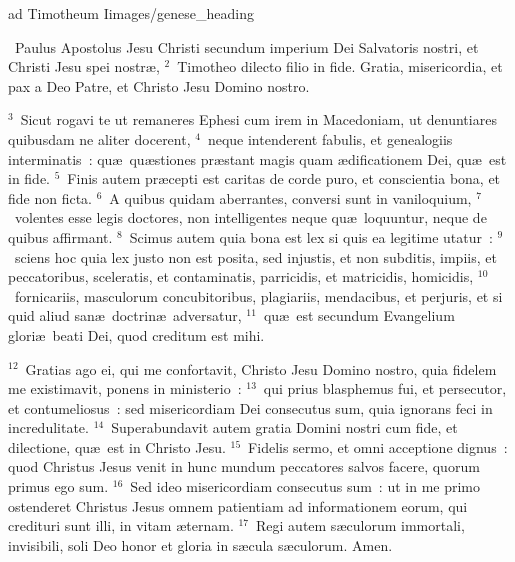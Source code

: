 {ad Timotheum I}{images/genese_heading}

~\lettrine[lines=10,image=true,loversize=0.05,lraise=-0.03]{P}{}aulus Apostolus Jesu Christi secundum imperium Dei Salvatoris nostri, et Christi Jesu spei nostr\ae ,
${}^{2}$~Timotheo dilecto filio in fide. Gratia, misericordia, et pax a Deo Patre, et Christo Jesu Domino nostro.


${}^{3}$~Sicut rogavi te ut remaneres Ephesi cum irem in Macedoniam, ut denuntiares quibusdam ne aliter docerent,
${}^{4}$~neque intenderent fabulis, et genealogiis interminatis~: qu\ae\ qu\ae stiones pr\ae stant magis quam \ae dificationem Dei, qu\ae\ est in fide.
${}^{5}$~Finis autem pr\ae cepti est caritas de corde puro, et conscientia bona, et fide non ficta.
${}^{6}$~A quibus quidam aberrantes, conversi sunt in vaniloquium,
${}^{7}$~volentes esse legis doctores, non intelligentes neque qu\ae\ loquuntur, neque de quibus affirmant.
${}^{8}$~Scimus autem quia bona est lex si quis ea legitime utatur~:
${}^{9}$~sciens hoc quia lex justo non est posita, sed injustis, et non subditis, impiis, et peccatoribus, sceleratis, et contaminatis, parricidis, et matricidis, homicidis,
${}^{10}$~fornicariis, masculorum concubitoribus, plagiariis, mendacibus, et perjuris, et si quid aliud san\ae\ doctrin\ae\ adversatur,
${}^{11}$~qu\ae\ est secundum Evangelium glori\ae\ beati Dei, quod creditum est mihi.


${}^{12}$~Gratias ago ei, qui me confortavit, Christo Jesu Domino nostro, quia fidelem me existimavit, ponens in ministerio~:
${}^{13}$~qui prius blasphemus fui, et persecutor, et contumeliosus~: sed misericordiam Dei consecutus sum, quia ignorans feci in incredulitate.
${}^{14}$~Superabundavit autem gratia Domini nostri cum fide, et dilectione, qu\ae\ est in Christo Jesu.
${}^{15}$~Fidelis sermo, et omni acceptione dignus~: quod Christus Jesus venit in hunc mundum peccatores salvos facere, quorum primus ego sum.
${}^{16}$~Sed ideo misericordiam consecutus sum~: ut in me primo ostenderet Christus Jesus omnem patientiam ad informationem eorum, qui credituri sunt illi, in vitam \ae ternam.
${}^{17}$~Regi autem s\ae culorum immortali, invisibili, soli Deo honor et gloria in s\ae cula s\ae culorum. Amen.


